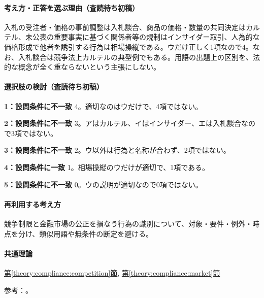 \paragraph{考え方・正答を選ぶ理由（査読待ち初稿）} 入札の受注者・価格の事前調整は入札談合、商品の価格・数量の共同決定はカルテル、未公表の重要事実に基づく関係者等の規制はインサイダー取引、人為的な価格形成で他者を誘引する行為は相場操縦である。ウだけ正しく1項なので4。なお、入札談合は競争法上カルテルの典型例でもある。用語の出題上の区別を、法的な概念が全く重ならないという主張にしない。

\paragraph{選択肢の検討（査読待ち初稿）}\mbox{}\par

\noindent\textbf{1：設問条件に不一致} 4。適切なのはウだけで、4項ではない。\par

\noindent\textbf{2：設問条件に不一致} 3。アはカルテル、イはインサイダー、エは入札談合なので3項ではない。\par

\noindent\textbf{3：設問条件に不一致} 2。ウ以外は行為と名称が合わず、2項ではない。\par

\noindent\textbf{4：設問条件に一致} 1。相場操縦のウだけが適切で、1項である。\par

\noindent\textbf{5：設問条件に不一致} 0。ウの説明が適切なので0項ではない。\par

\paragraph{再利用する考え方} 競争制限と金融市場の公正を損なう行為の識別について、対象・要件・例外・時点を分け、類似用語や無条件の断定を避ける。

\paragraph{共通理論} \hyperref[theory:compliance:competition]{第\ref*{theory:compliance:competition}節}, \hyperref[theory:compliance:market]{第\ref*{theory:compliance:market}節}

\par 参考：\cite{jftc_rules,jftc_bid_cartel2021,fsa_market2004,fsa_information}。


